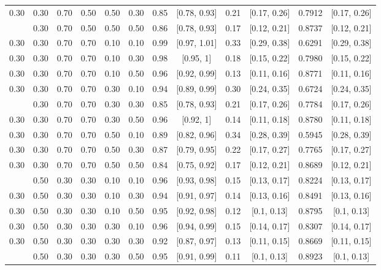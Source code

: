 \documentclass[
  11pt,
]{article}
\begin{document}
\begin{landscape}
\begin{ThreePartTable}
\begin{longtable}[t]{cccccccccccc}
0.30 & 0.30 & 0.70 & 0.50 & 0.50 & 0.30 & 0.85 & {}[0.78, 0.93] & 0.21 & {}[0.17, 0.26] & 0.7912 & {}[0.17, 0.26]\\
\addlinespace
0.30 & 0.30 & 0.70 & 0.50 & 0.50 & 0.50 & 0.86 & {}[0.78, 0.93] & 0.17 & {}[0.12, 0.21] & 0.8737 & {}[0.12, 0.21]\\
0.30 & 0.30 & 0.70 & 0.70 & 0.10 & 0.10 & 0.99 & {}[0.97, 1.01] & 0.33 & {}[0.29, 0.38] & 0.6291 & {}[0.29, 0.38]\\
0.30 & 0.30 & 0.70 & 0.70 & 0.10 & 0.30 & 0.98 & {}[0.95, 1] & 0.18 & {}[0.15, 0.22] & 0.7980 & {}[0.15, 0.22]\\
0.30 & 0.30 & 0.70 & 0.70 & 0.10 & 0.50 & 0.96 & {}[0.92, 0.99] & 0.13 & {}[0.11, 0.16] & 0.8771 & {}[0.11, 0.16]\\
0.30 & 0.30 & 0.70 & 0.70 & 0.30 & 0.10 & 0.94 & {}[0.89, 0.99] & 0.30 & {}[0.24, 0.35] & 0.6724 & {}[0.24, 0.35]\\
\addlinespace
0.30 & 0.30 & 0.70 & 0.70 & 0.30 & 0.30 & 0.85 & {}[0.78, 0.93] & 0.21 & {}[0.17, 0.26] & 0.7784 & {}[0.17, 0.26]\\
0.30 & 0.30 & 0.70 & 0.70 & 0.30 & 0.50 & 0.96 & {}[0.92, 1] & 0.14 & {}[0.11, 0.18] & 0.8780 & {}[0.11, 0.18]\\
0.30 & 0.30 & 0.70 & 0.70 & 0.50 & 0.10 & 0.89 & {}[0.82, 0.96] & 0.34 & {}[0.28, 0.39] & 0.5945 & {}[0.28, 0.39]\\
0.30 & 0.30 & 0.70 & 0.70 & 0.50 & 0.30 & 0.87 & {}[0.79, 0.95] & 0.22 & {}[0.17, 0.27] & 0.7765 & {}[0.17, 0.27]\\
0.30 & 0.30 & 0.70 & 0.70 & 0.50 & 0.50 & 0.84 & {}[0.75, 0.92] & 0.17 & {}[0.12, 0.21] & 0.8689 & {}[0.12, 0.21]\\
\addlinespace
0.30 & 0.50 & 0.30 & 0.30 & 0.10 & 0.10 & 0.96 & {}[0.93, 0.98] & 0.15 & {}[0.13, 0.17] & 0.8224 & {}[0.13, 0.17]\\
0.30 & 0.50 & 0.30 & 0.30 & 0.10 & 0.30 & 0.94 & {}[0.91, 0.97] & 0.14 & {}[0.13, 0.16] & 0.8491 & {}[0.13, 0.16]\\
0.30 & 0.50 & 0.30 & 0.30 & 0.10 & 0.50 & 0.95 & {}[0.92, 0.98] & 0.12 & {}[0.1, 0.13] & 0.8795 & {}[0.1, 0.13]\\
0.30 & 0.50 & 0.30 & 0.30 & 0.30 & 0.10 & 0.96 & {}[0.94, 0.99] & 0.15 & {}[0.14, 0.17] & 0.8307 & {}[0.14, 0.17]\\
0.30 & 0.50 & 0.30 & 0.30 & 0.30 & 0.30 & 0.92 & {}[0.87, 0.97] & 0.13 & {}[0.11, 0.15] & 0.8669 & {}[0.11, 0.15]\\
\addlinespace
0.30 & 0.50 & 0.30 & 0.30 & 0.30 & 0.50 & 0.95 & {}[0.91, 0.99] & 0.11 & {}[0.1, 0.13] & 0.8923 & {}[0.1, 0.13]\\

\end{longtable}
\end{ThreePartTable}
\end{landscape}
\end{document}
